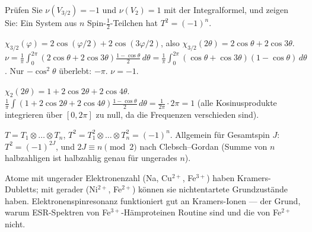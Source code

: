 \begin{aufgabe}
Prüfen Sie $\nu(V_{3/2}) = -1$ und $\nu(V_2) = 1$ mit der Integralformel, und zeigen Sie: Ein System aus $n$ Spin-$\frac12$-Teilchen hat $T^{2} = (-1)^{n}$.

\loesung
{}
$\chi_{3/2}(\varphi) = 2\cos(\varphi/2) + 2\cos(3\varphi/2)$, also $\chi_{3/2}(2\theta) = 2\cos\theta + 2\cos3\theta$. $\nu = \frac1\pi\int_0^{2\pi}(2\cos\theta + 2\cos3\theta)\frac{1 - \cos\theta}2\,d\theta = \frac1\pi\int_0^{2\pi}(\cos\theta + \cos3\theta)(1 - \cos\theta)\,d\theta$. Nur $-\cos^{2}\theta$ überlebt: $-\pi$. $\nu = -1$. \checkmark

$\chi_2(2\theta) = 1 + 2\cos2\theta + 2\cos4\theta$. $\frac1\pi\int(1 + 2\cos2\theta + 2\cos4\theta)\frac{1 - \cos\theta}2\,d\theta = \frac1{2\pi}\cdot2\pi = 1$ (alle Kosinusprodukte integrieren über $[0, 2\pi]$ zu null, da die Frequenzen verschieden sind). \checkmark

$T = T_1\otimes\dots\otimes T_n$, $T^{2} = T_1^{2}\otimes\dots\otimes T_n^{2} = (-1)^{n}$. Allgemein für Gesamtspin $J$: $T^{2} = (-1)^{2J}$, und $2J\equiv n\pmod2$ nach Clebsch--Gordan (Summe von $n$ halbzahligen ist halbzahlig genau für ungerades $n$). \checkmark

Atome mit ungerader Elektronenzahl (Na, Cu$^{2+}$, Fe$^{3+}$) haben Kramers-Dubletts; mit gerader (Ni$^{2+}$, Fe$^{2+}$) können sie nichtentartete Grundzustände haben. Elektronenspinresonanz funktioniert gut an Kramers-Ionen --- der Grund, warum ESR-Spektren von Fe$^{3+}$-Hämproteinen Routine sind und die von Fe$^{2+}$ nicht.

\begin{center}
\begin{minipage}{0.88\textwidth}
\end{minipage}
\end{center}
\end{aufgabe}

